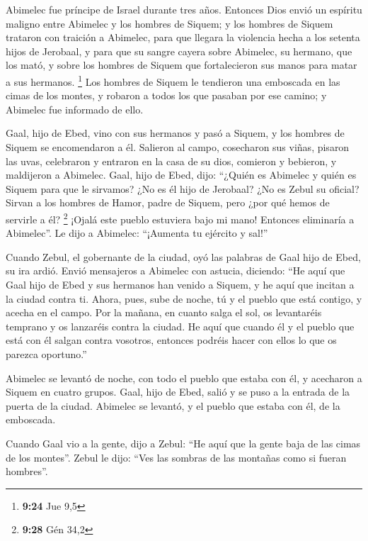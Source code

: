  Abimelec fue príncipe de Israel durante tres años.
 Entonces Dios envió un espíritu maligno entre Abimelec y
los hombres de Siquem; y los hombres de Siquem trataron con traición a
Abimelec,  para que llegara la violencia hecha a los
setenta hijos de Jerobaal, y para que su sangre cayera sobre Abimelec,
su hermano, que los mató, y sobre los hombres de Siquem que
fortalecieron sus manos para matar a sus hermanos. \footnote{\textbf{9:24}
  Jue 9,5}  Los hombres de Siquem le tendieron una
emboscada en las cimas de los montes, y robaron a todos los que pasaban
por ese camino; y Abimelec fue informado de ello.

 Gaal, hijo de Ebed, vino con sus hermanos y pasó a
Siquem, y los hombres de Siquem se encomendaron a él. 
Salieron al campo, cosecharon sus viñas, pisaron las uvas, celebraron y
entraron en la casa de su dios, comieron y bebieron, y maldijeron a
Abimelec.  Gaal, hijo de Ebed, dijo: ``¿Quién es Abimelec
y quién es Siquem para que le sirvamos? ¿No es él hijo de Jerobaal? ¿No
es Zebul su oficial? Sirvan a los hombres de Hamor, padre de Siquem,
pero ¿por qué hemos de servirle a él? \footnote{\textbf{9:28} Gén 34,2}
 ¡Ojalá este pueblo estuviera bajo mi mano! Entonces
eliminaría a Abimelec''. Le dijo a Abimelec: ``¡Aumenta tu ejército y
sal!''

 Cuando Zebul, el gobernante de la ciudad, oyó las
palabras de Gaal hijo de Ebed, su ira ardió.  Envió
mensajeros a Abimelec con astucia, diciendo: ``He aquí que Gaal hijo de
Ebed y sus hermanos han venido a Siquem, y he aquí que incitan a la
ciudad contra ti.  Ahora, pues, sube de noche, tú y el
pueblo que está contigo, y acecha en el campo.  Por la
mañana, en cuanto salga el sol, os levantaréis temprano y os lanzaréis
contra la ciudad. He aquí que cuando él y el pueblo que está con él
salgan contra vosotros, entonces podréis hacer con ellos lo que os
parezca oportuno.''

 Abimelec se levantó de noche, con todo el pueblo que
estaba con él, y acecharon a Siquem en cuatro grupos. 
Gaal, hijo de Ebed, salió y se puso a la entrada de la puerta de la
ciudad. Abimelec se levantó, y el pueblo que estaba con él, de la
emboscada.

 Cuando Gaal vio a la gente, dijo a Zebul: ``He aquí que
la gente baja de las cimas de los montes''. Zebul le dijo: ``Ves las
sombras de las montañas como si fueran hombres''.

